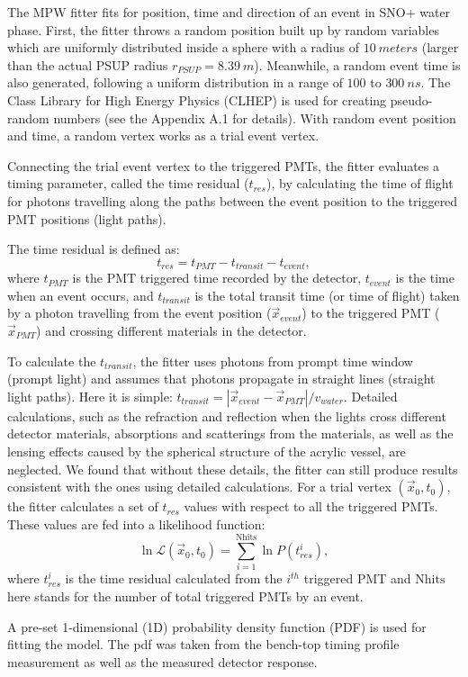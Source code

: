 The MPW fitter fits for position, time and direction of an event in SNO+ water phase. First, the fitter throws a random position built up by random variables which are uniformly distributed inside a sphere with a radius of $10~meters$ (larger than the actual PSUP radius $r_{PSUP}=8.39~m$).
Meanwhile, a random event time is also generated, following a uniform distribution in a range of $100$ to $300~ns$. The Class Library for High Energy Physics (CLHEP) is used for creating pseudo-random numbers (see the Appendix A.1 for details). With random event position and time, a random vertex works as a trial event vertex. 

Connecting the trial event vertex to the triggered PMTs, the fitter evaluates a timing parameter, called the time residual ($t_{res}$), by calculating the time of flight for photons travelling along the paths between the event position to the triggered PMT positions (light paths).

The time residual is defined as:
\[
t_{res}=t_{PMT} - t_{transit} - t_{event},
\]
where $t_{PMT}$ is the PMT triggered time recorded by the detector, $t_{event}$ is the time when an event occurs, and $t_{transit}$ is the total transit time (or time of flight) taken by a photon travelling from the event position ($\vec{x}_{event}$) to the triggered PMT ($\vec{x}_{PMT}$) and crossing different materials in the detector.

To calculate the $t_{transit}$, the fitter uses photons from prompt time window (prompt light) and assumes that photons propagate in straight lines (straight light paths). Here it is simple: $t_{transit}=|\vec{x}_{event}-\vec{x}_{PMT}|/v_{water}$. Detailed calculations, such as the refraction and reflection when the lights cross different detector materials, absorptions and scatterings from the materials, as well as the lensing effects caused by the spherical structure of the acrylic vessel, are neglected. We found that without these details, the fitter can still produce results consistent with the ones using detailed calculations. 
For a trial vertex $(\vec{x}_0,t_0)$, the fitter calculates a set of $t_{res}$ values with respect to all the triggered PMTs. These values are fed into a likelihood function: 
\[
\ln\mathcal{L}(\vec{x}_0,t_0)=\sum_{i=1}^{{\mathrm{Nhits}}}\ln P(t^i_{res}),
\]
where $t^i_{res}$ is the time residual calculated from the $i^{th}$ triggered PMT and $\mathrm{Nhits}$ here stands for the number of total triggered PMTs by an event.

A pre-set 1-dimensional (1D) probability density function (PDF) is used for fitting the model. The pdf was taken from the bench-top timing profile measurement as well as the measured detector response.


